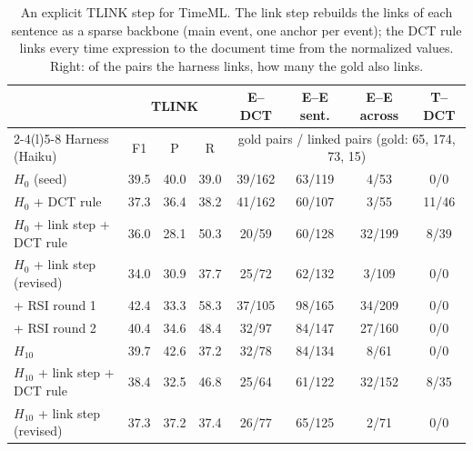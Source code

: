 \begin{table}[t]
\centering\small
\setlength{\tabcolsep}{5pt}
\begin{tabular}{@{}lccccccc@{}}
\toprule
& \multicolumn{3}{c}{TLINK} & E--DCT & E--E sent. & E--E across & T--DCT \\
\cmidrule(lr){2-4}\cmidrule(l){5-8}
Harness (Haiku) & F1 & P & R & \multicolumn{4}{c}{gold pairs / linked pairs (gold: 65, 174, 73, 15)} \\
\midrule
$H_0$ (seed) & 39.5 & 40.0 & 39.0 & 39/162 & 63/119 & 4/53 & 0/0 \\
$H_0$ + DCT rule & 37.3 & 36.4 & 38.2 & 41/162 & 60/107 & 3/55 & 11/46 \\
$H_0$ + link step + DCT rule & 36.0 & 28.1 & 50.3 & 20/59 & 60/128 & 32/199 & 8/39 \\
$H_0$ + link step (revised) & 34.0 & 30.9 & 37.7 & 25/72 & 62/132 & 3/109 & 0/0 \\
\quad + RSI round 1 & 42.4 & 33.3 & 58.3 & 37/105 & 98/165 & 34/209 & 0/0 \\
\quad + RSI round 2 & 40.4 & 34.6 & 48.4 & 32/97 & 84/147 & 27/160 & 0/0 \\
$H_{10}$ & 39.7 & 42.6 & 37.2 & 32/78 & 84/134 & 8/61 & 0/0 \\
$H_{10}$ + link step + DCT rule & 38.4 & 32.5 & 46.8 & 25/64 & 61/122 & 32/152 & 8/35 \\
$H_{10}$ + link step (revised) & 37.3 & 37.2 & 37.4 & 26/77 & 65/125 & 2/71 & 0/0 \\
\bottomrule
\end{tabular}
\caption{An explicit TLINK step for TimeML. The link step rebuilds the links of each sentence as a sparse backbone (main event, one anchor per event); the DCT rule links every time expression to the document time from the normalized values. Right: of the pairs the harness links, how many the gold also links.}
\label{tab:link}
\end{table}
